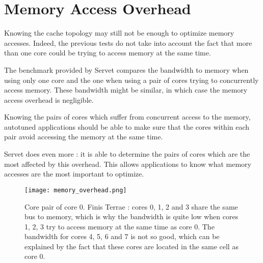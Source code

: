 \section{Memory Access Overhead}
Knowing the cache topology may still not be enough to optimize memory accesses.
Indeed, the previous tests do not take into account the fact that more than one
core could be trying to access memory at the same time.

The benchmark provided by Servet compares the bandwidth to memory when using
only one core and the one when using a pair of cores trying to concurrently
access memory. These bandwidth might be similar, in which case the memory
access overhead is negligible.

Knowing the pairs of cores which suffer from concurrent access to the memory,
autotuned applications should be able to make sure that the cores within each
pair avoid accessing the memory at the same time.

Servet does even more : it is able to determine the pairs of cores which are the
most affected by this overhead. This allows applications to know what memory
accesses are the most important to optimize.

\begin{figure}
    \center
    \texttt{[image: memory\_overhead.png]}
    \caption{Core pair of core 0. Finis Terrae : cores 0, 1, 2 and 3 share the
same bus to memory, which is why the bandwidth is quite low when cores 1, 2, 3
try to access memory at the same time as core 0. The bandwidth for cores 4, 5, 6
and 7 is not so good, which can be explained by the fact that these cores are
located in the same cell as core 0.} 
\end{figure}
